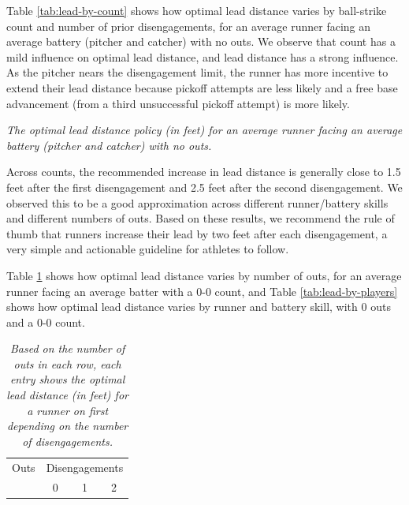 \documentclass{article}
\begin{document}
      Table \ref{tab:lead-by-count} shows how optimal lead distance varies by ball-strike count and number of prior disengagements, for an average runner facing an average battery (pitcher and catcher) with no outs. We observe that count has a mild influence on optimal lead distance, and lead distance has a strong influence. As the pitcher nears the disengagement limit, the runner has more incentive to extend their lead distance because pickoff attempts are less likely and a free base advancement (from a third unsuccessful pickoff attempt) is more likely.
 
      \begin{table}
        \centering
        
        \caption{
          \it The optimal lead distance policy (in feet) for an average runner facing an average battery (pitcher and catcher) with no outs.
        }
        \label{tab:lead-by-count}
      \end{table}
      
      Across counts, the recommended increase in lead distance is generally close to 1.5 feet after the first disengagement and 2.5 feet after the second disengagement. We observed this to be a good approximation across different runner/battery skills and different numbers of outs. Based on these results, we recommend the rule of thumb that runners increase their lead by two feet after each disengagement, a very simple and actionable guideline for athletes to follow.
    
      Table \ref{tab:lead-by-runners-outs} shows how optimal lead distance varies by number of outs, for an average runner facing an average batter with a 0-0 count, and Table \ref{tab:lead-by-players} shows how optimal lead distance varies by runner and battery skill, with 0 outs and a 0-0 count.

      \begin{table}
        \centering
        \begin{tabular}{c|ccc}
          Outs  & \multicolumn{3}{c}{Disengagements}\\
                & 0 & 1 & 2 \\
          \hline
          
        \end{tabular}
        \caption{
          \it Based on the number of outs in each row, each entry shows the optimal lead distance (in feet) for a runner on first depending on the number of disengagements.
        }
        \label{tab:lead-by-runners-outs}
      \end{table}
\end{document}
